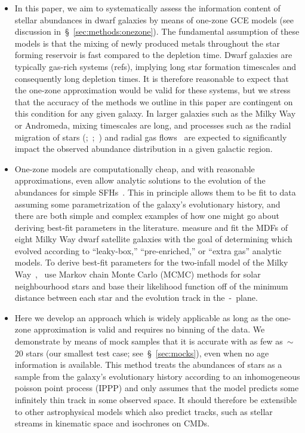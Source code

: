 \documentclass[ms.tex]{subfiles}
\begin{document}
\begin{itemize}
	\item In this paper, we aim to systematically assess the information
	content of stellar abundances in dwarf galaxies by means of one-zone GCE
	models (see discussion in~\S~\ref{sec:methods:onezone}).
	The fundamental assumption of these models is that the mixing of newly
	produced metals throughout the star forming reservoir is fast compared to
	the depletion time.
	Dwarf galaxies are typically gas-rich systems (refs), implying long star
	formation timescales and consequently long depletion times.
	It is therefore reasonable to expect that the one-zone approximation would
	be valid for these systems, but we stress that the accuracy of the methods
	we outline in this paper are contingent on this condition for any given
	galaxy.
	In larger galaxies such as the Milky Way or Andromeda, mixing timescales
	are long, and processes such as the radial migration of stars
	(\citealp{Sellwood2002, Schoenrich2009, Minchev2011};~\citealp*{Minchev2013,
	Minchev2014};~\citealp{Minchev2017, Johnson2021, Chen2022}) and radial gas
	flows~\citep{Lacey1985, Bilitewski2012, Vincenzo2018} are expected to
	significantly impact the observed abundance distribution in a given
	galactic region.

	\item One-zone models are computationally cheap, and with reasonable
	approximations, even allow analytic solutions to the evolution of the
	abundances for simple SFHs~\citep*[e.g.][]{Weinberg2017}.
	This in principle allows them to be fit to data assuming some
	parametrization of the galaxy's evolutionary history, and there are both
	simple and complex examples of how one might go about deriving best-fit
	parameters in the literature.
	\citet{Kirby2011} measure and fit the MDFs of eight Milky Way dwarf
	satellite galaxies with the goal of determining which evolved according to
	``leaky-box,'' ``pre-enriched,'' or ``extra gas'' analytic models.
	To derive best-fit parameters for the two-infall model of the Milky
	Way~\citep[e.g.][]{Chiappini1997},~\citet{Spitoni2020} use Markov chain
	Monte Carlo (MCMC) methods for solar neighbourhood stars and base their
	likelihood function off of the minimum distance between each star and the
	evolution track in the~\afe-\feh~plane.

	\item Here we develop an approach which is widely applicable as long as the
	one-zone approximation is valid and requires no binning of the data.
	We demonstrate by means of mock samples that it is accurate with as few
	as~$\sim$20 stars (our smallest test case; see~\S~\ref{sec:mocks}), even
	when no age information is available.
	This method treats the abundances of stars as a sample from the galaxy's
	evolutionary history according to an inhomogeneous poisson point process
	(IPPP) and only assumes that the model predicts some infinitely thin track
	in some observed space.
	It should therefore be extensible to other astrophysical models which also
	predict tracks, such as stellar streams in kinematic space and isochrones
	on CMDs.


\end{itemize}
\end{document}
